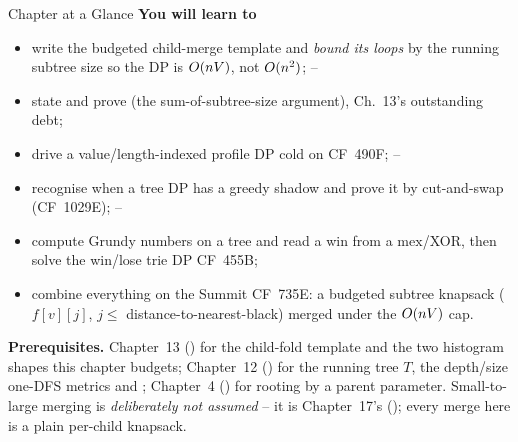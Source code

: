 \begin{chaptertheorybox}{Chapter at a Glance}
\textbf{You will learn to}
\begin{itemize}[nosep]
  \item write the budgeted child-merge template and \emph{bound its loops}
        by the running subtree size so the DP is $O(nV)$, not $O(n^2)$; \hfill{}--
  \item state and prove  (the sum-of-subtree-size
        argument), Ch.~13's outstanding debt; \hfill{}
  \item drive a value/length-indexed profile DP cold on CF~490F; \hfill{}--
  \item recognise when a tree DP has a greedy shadow and prove it by
        cut-and-swap (CF~1029E); \hfill{}--
  \item compute Grundy numbers on a tree and read a win from a
        $\mathrm{mex}$/XOR, then solve the win/lose trie DP CF~455B; \hfill{}
  \item combine everything on the Summit CF~735E: a budgeted subtree knapsack
        ($f[v][j]$, $j\le$ distance-to-nearest-black) merged under the
        $O(nV)$ cap. \hfill{}
\end{itemize}

\textbf{Prerequisites.} Chapter~13 () for the child-fold template
 and the two histogram shapes this chapter budgets;
Chapter~12 () for the running tree $T$, the depth/size one-DFS
metrics and ; Chapter~4 () for rooting by a
parent parameter. Small-to-large merging is \emph{deliberately not assumed} --
it is Chapter~17's (); every merge here is a plain per-child knapsack.
\end{chaptertheorybox}


